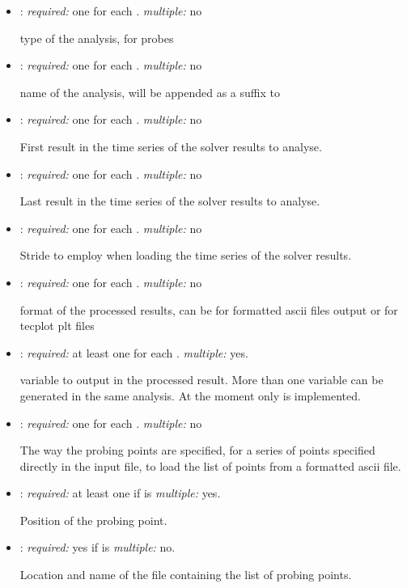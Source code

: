 \begin{itemize}
\item {}: \textit{required:} one for each . \textit{multiple:} no

type of the analysis,  for probes

\item {}: \textit{required:} one for each . \textit{multiple:} no

name of the analysis, will be appended as a suffix to 

\item {}: \textit{required:} one for each . \textit{multiple:} no

First result in the time series of the solver results to analyse.

\item {}: \textit{required:} one for each . \textit{multiple:} no

Last result in the time series of the solver results to analyse.

\item {}: \textit{required:} one for each . \textit{multiple:} no

Stride to employ when loading the time series of the solver results. 

\item {}: \textit{required:} one for each . \textit{multiple:} no

format of the processed results, can be  for formatted ascii files output or  for tecplot plt files

\item {}: \textit{required:} at least one for each . \textit{multiple:} yes.

variable to output in the processed result. More than one variable can be generated in the same analysis. At the moment only  is implemented.

\item {}: \textit{required:} one for each . \textit{multiple:} no

The way the probing points are specified,  for a series of points specified directly in the input file,  to load the list of points from a formatted ascii file.

\item {}: \textit{required:} at least one if  is  \textit{multiple:} yes.

Position of the probing point.

\item {}: \textit{required:} yes if  is  \textit{multiple:} no.

Location and name of the file containing the list of probing points.

\end{itemize}

